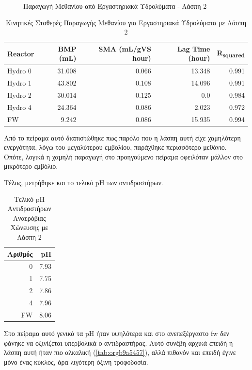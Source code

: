 \documentclass[11pt]{report}
\begin{document}
\begin{enumerate}
\begin{figure}[htbp]
\centering

\caption{\label{fig:orgf60542a}Παραγωγή Μεθανίου από Εργαστηριακά Υδρολύματα - Λάσπη 2}
\end{figure}

\begin{table}[htbp]
\caption{\label{tab:orga84f669}Κινητικές Σταθερές Παραγωγής Μεθανίου για Εργαστηριακά Υδρολύματα με Λάσπη 2}
\centering
\begin{tabular}{lrrrr}
Reactor & BMP (mL) & SMA (mL/gVS hour) & Lag Time (hour) & R\textsubscript{squared}\\[0pt]
\hline
Hydro 0 & 31.008 & 0.066 & 13.348 & 0.991\\[0pt]
Hydro 1 & 43.802 & 0.108 & 14.096 & 0.991\\[0pt]
Hydro 2 & 30.014 & 0.125 & 0.0 & 0.984\\[0pt]
Hydro 4 & 24.364 & 0.086 & 2.023 & 0.972\\[0pt]
FW & 9.242 & 0.086 & 15.935 & 0.994\\[0pt]
\end{tabular}
\end{table}

Από το πείραμα αυτό διαπιστώθηκε πως παρόλο που η λάσπη αυτή είχε χαμηλότερη ενεργότητα, λόγω του μεγαλύτερου εμβολίου, παράχθηκε περισσότερο μεθάνιο. Οπότε, λογικά η χαμηλή παραγωγή στο προηγούμενο πείραμα οφειλόταν μάλλον στο μικρότερο εμβόλιο.

Τέλος, μετρήθηκε και το τελικό pH των αντιδραστήρων.

\begin{table}[htbp]
\caption{\label{tab:orgf03b17e}Τελικό pH Αντιδραστήρων Αναερόβιας Χώνευσης με Λάσπη 2}
\centering
\begin{tabular}{rr}
Αριθμός & pH\\[0pt]
\hline
0 & 7.93\\[0pt]
1 & 7.75\\[0pt]
2 & 7.86\\[0pt]
4 & 7.96\\[0pt]
FW & 8.06\\[0pt]
\end{tabular}
\end{table}

Στο πείραμα αυτό γενικά τα pH ήταν υψηλότερα και στο ανεπεξέργαστο \acrshort{fw} δεν φάνηκε να οξινίζεται υπερβολικά ο αντιδραστήρας. Αυτό συνέβη αρχικά επειδή η λάσπη αυτή ήταν πιο αλκαλική (\ref{tab:orgb9a5457}), αλλά πιθανόν και επειδή έγινε μόνο ένας κύκλος, άρα λιγότερη όξινη τροφοδοσία.


\end{enumerate}
\end{document}
